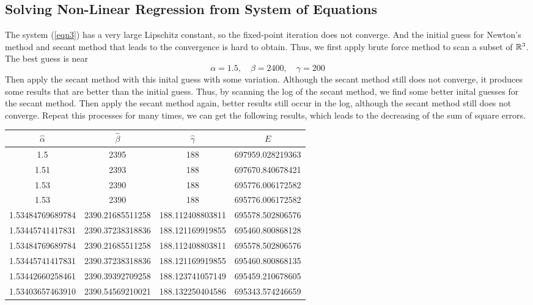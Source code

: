 \begin{table}[H]
\begin{table}[H]
\begin{table}[H]
\begin{table}[H]
\subsection{Solving Non-Linear Regression from System of Equations}
The system (\ref{eqn3}) has a very large Lipschitz constant, so the fixed-point iteration does not converge.
And the initial guess for Newton's method and secant method that leads to the convergence is hard to obtain.
Thus, we first apply brute force method to scan a subset of \(\mathbb{R}^3\).
The best guess is near
\[ \alpha=1.5,\quad \beta=2400, \quad \gamma=200 \]
Then apply the secant method with this inital guess with some variation.
Although the secant method still does not converge, it produces some results that are better than the initial guess.
Thus, by scanning the log of the secant method, we find some better inital guesses for the secant method.
Then apply the secant method again, better results still occur in the log, although the secant method still does not converge.
Repeat this processes for many times, we can get the following results, which leads to the decreasing of the sum of square errors.
\ifnum{}
	\begin{table}[H]
\else
	\begin{table}[htbp]
\fi
	\centering
	\begin{tabular}{|c|c|c|c|}
	\hline
	\(\hat\alpha\)	&	\(\hat\beta\)	&	\(\hat\gamma\)	&	\hyperref[sse]{\(E\)}	\\	\hline
	1.5					&	2395				&	188					&	697959.028219363	\\	\hline	
	1.51				&	2393				&	188					&	697670.840678421	\\	\hline	
	1.53				&	2390				&	188					&	695776.006172582	\\	\hline	
	1.53				&	2390				&	188					&	695776.006172582	\\	\hline	
	1.53484769689784	&	2390.21685511258	&	188.112408803811	&	695578.502806576	\\	\hline	
	1.53445741417831	&	2390.37238318836	&	188.121169919855	&	695460.800868128	\\	\hline	
	1.53484769689784	&	2390.21685511258	&	188.112408803811	&	695578.502806576	\\	\hline	
	1.53445741417831	&	2390.37238318836	&	188.121169919855	&	695460.800868135	\\	\hline	
	1.53442660258461	&	2390.39392709258	&	188.123741057149	&	695459.210678605	\\	\hline	
	1.53403657463910	&	2390.54569210021	&	188.132250404586	&	695343.574246659	\\	\hline	

\end{tabular}
\end{table}
\end{table}
\end{table}
\end{table}
\end{table}
\end{table}

